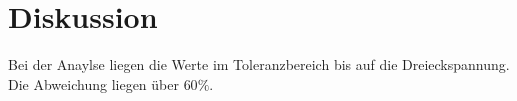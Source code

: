 \section{Diskussion}
Bei der Anaylse liegen die Werte im Toleranzbereich bis auf die Dreieckspannung.
Die Abweichung liegen über $60 \%$. 
